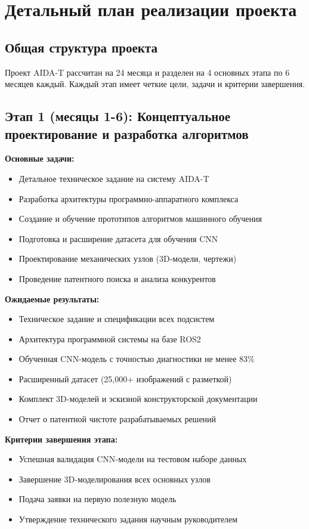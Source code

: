\documentclass[12pt,a4paper]{article}
\begin{document}
\section{Детальный план реализации проекта}

\subsection{Общая структура проекта}
Проект AIDA-T рассчитан на 24 месяца и разделен на 4 основных этапа по 6 месяцев каждый. Каждый этап имеет четкие цели, задачи и критерии завершения.

\subsection{Этап 1 (месяцы 1-6): Концептуальное проектирование и разработка алгоритмов}

\textbf{Основные задачи:}
\begin{itemize}
    \item Детальное техническое задание на систему AIDA-T
    \item Разработка архитектуры программно-аппаратного комплекса
    \item Создание и обучение прототипов алгоритмов машинного обучения
    \item Подготовка и расширение датасета для обучения CNN
    \item Проектирование механических узлов (3D-модели, чертежи)
    \item Проведение патентного поиска и анализа конкурентов
\end{itemize}

\textbf{Ожидаемые результаты:}
\begin{itemize}
    \item Техническое задание и спецификации всех подсистем
    \item Архитектура программной системы на базе ROS2
    \item Обученная CNN-модель с точностью диагностики не менее 83\%
    \item Расширенный датасет (25,000+ изображений с разметкой)
    \item Комплект 3D-моделей и эскизной конструкторской документации
    \item Отчет о патентной чистоте разрабатываемых решений
\end{itemize}

\textbf{Критерии завершения этапа:}
\begin{itemize}
    \item Успешная валидация CNN-модели на тестовом наборе данных
    \item Завершение 3D-моделирования всех основных узлов
    \item Подача заявки на первую полезную модель
    \item Утверждение технического задания научным руководителем
\end{itemize}
\end{document}
